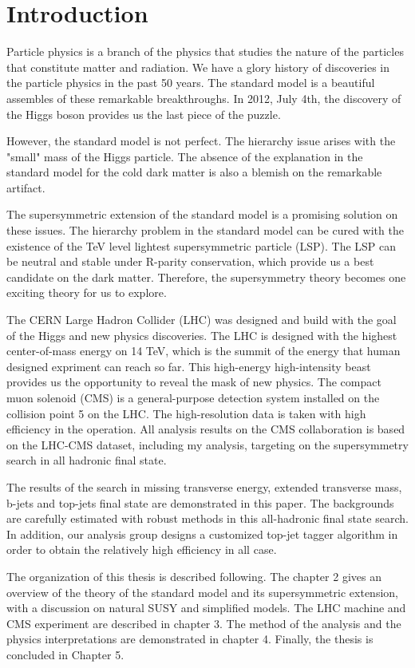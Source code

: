 \chapter{Introduction}
Particle physics is a branch of the physics that studies the nature of the particles that constitute matter and radiation. We have a glory history of discoveries in the particle physics in the past 50 years. The standard model is a beautiful assembles of these remarkable breakthroughs. In 2012, July 4th, the discovery of the Higgs boson provides us the last piece of the puzzle.

However, the standard model is not perfect. The hierarchy issue arises with the "small" mass of the Higgs particle. The absence of the explanation in the standard model for the cold dark matter is also a blemish on the remarkable artifact.

The supersymmetric extension of the standard model is a promising solution on these issues. The hierarchy problem in the standard model can be cured with the existence of the TeV level lightest supersymmetric particle (LSP). The LSP can be neutral and stable under R-parity conservation, which provide us a best candidate on the dark matter. Therefore, the supersymmetry theory becomes one exciting theory for us to explore.

The CERN Large Hadron Collider (LHC) was designed and build with the goal of the Higgs and new physics discoveries. The LHC is designed with the highest center-of-mass energy on 14 TeV, which is the summit of the energy that human designed expriment can reach so far. This high-energy high-intensity beast provides us the opportunity to reveal the mask of new physics. The compact muon solenoid (CMS) is a general-purpose detection system installed on the collision point 5 on the LHC. The high-resolution data is taken with high efficiency in the operation. All analysis results on the CMS collaboration is based on the LHC-CMS dataset, including my analysis, targeting on the supersymmetry search in all hadronic final state.

The results of the search in missing transverse energy, extended transverse mass, b-jets and top-jets final state are demonstrated in this paper. The backgrounds are carefully estimated with robust methods in this all-hadronic final state search. In addition, our analysis group designs a customized top-jet tagger algorithm in order to obtain the relatively high efficiency in all case.

The organization of this thesis is described following. The chapter 2 gives an overview of the theory of the standard model and its supersymmetric extension, with a discussion on natural SUSY and simplified models. The LHC machine and CMS experiment are described in chapter 3. The method of the analysis and the physics interpretations are demonstrated in chapter 4. Finally, the thesis is concluded in Chapter 5.

